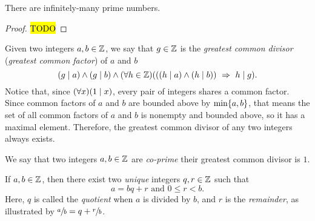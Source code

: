 \begin{theorem}
    There are infinitely-many prime numbers.
\end{theorem}
\begin{proof}
    \hl{TODO}
\end{proof}

\begin{definition}
    Given two integers $a, b \in \mathbb{Z}$,
    we say that $g \in \mathbb{Z}$ is the \emph{greatest common divisor}
    (\aka \emph{greatest common factor})
    of $a$ and $b$ \iffbydefn
    \[
        \pn*{g \div a} \meet \pn*{g \div b} \meet
        \pn*{\forall h \in \Z}\pn*{\pn*{\pn*{h \div a} \meet \pn*{h \div b}} \implies h \div g}.
    \]
    Notice that, since $\pn*{\forall x}\pn*{1 \div x}$,
    every pair of integers shares a common factor.
    Since common factors of $a$ and $b$ are bounded above by $\min\set*{a, b}$,
    that means the set of all common factors of $a$ and $b$ is nonempty and bounded above,
    so it has a maximal element.
    Therefore, the greatest common divisor of any two integers always exists.
\end{definition}

\begin{definition}[Co-Primality]
    We say that two integers $a, b \in \mathbb{Z}$ are \emph{co-prime} \iffbydefn 
    their greatest common divisor is $1$.
\end{definition}

\begin{theorem}
    If $a, b \in \mathbb{Z}$, then there exist two \emph{unique} integers $q, r \in \mathbb{Z}$ such that
    \[
        a = bq + r
        \text{ and } 0 \leq r < b.
    \]
    Here, $q$ is called the \emph{quotient} when $a$ is divided by $b$,
    and $r$ is the \emph{remainder}, as illustrated by
    $\sfrac{a}{b} = q + \sfrac{r}{b}$.
\end{theorem}

